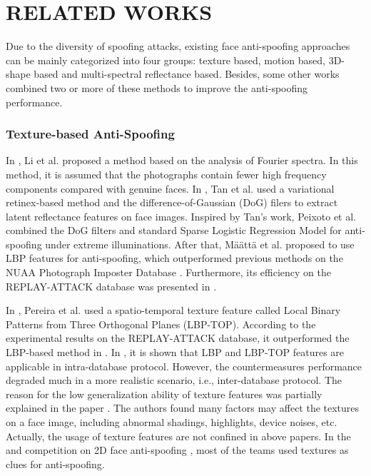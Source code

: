 \documentclass[letterpaper, 10 pt, conference]{ieeeconf}
\begin{document}
\section{RELATED WORKS}

Due to the diversity of spoofing attacks, existing face anti-spoofing approaches can be mainly categorized into four groups: texture based, motion based, 3D-shape based and multi-spectral reflectance based. Besides, some other works combined two or more of these methods to improve the anti-spoofing performance.

\subsubsection{Texture-based Anti-Spoofing}

In \cite{Face_Anti_Spoofing_JianweiLi_Fourier_2004}, Li et al. proposed a method based on the analysis of Fourier spectra. In this method, it is assumed that the photographs contain fewer high frequency components compared with genuine faces. In \cite{Face_Anti_Spoofing_XiaoyangTan_ECCV_2010}, Tan et al. used a variational retinex-based method and the difference-of-Gaussian (DoG) filers to extract latent reflectance features on face images. Inspired by Tan's work, Peixoto et al. \cite{DBLP:conf/icip/PeixotoMR11} combined the DoG filters and standard Sparse Logistic Regression Model for anti-spoofing under extreme illuminations. After that, M\"{a}\"{a}tt\"{a} et al. \cite{DBLP:conf/IJCB/Maatta} proposed to use LBP features for anti-spoofing, which outperformed previous methods on the NUAA Photograph Imposter Database \cite{DBLP:conf/eccv/TanLLJ10}. Furthermore, its efficiency on the REPLAY-ATTACK database was presented in \cite{Face_Anti_Spoofing_DataBase_Chingovska_2012}.

In \cite{de2013lbp}, Pereira et al. used a spatio-temporal texture feature called Local Binary Patterns from Three Orthogonal Planes (LBP-TOP). According to the experimental results on the REPLAY-ATTACK database, it outperformed the LBP-based method in \cite{DBLP:conf/IJCB/Maatta}. In \cite{Face_Anti_Spoofing_Pereira_2013}, it is shown that LBP and LBP-TOP features are applicable in intra-database protocol. However, the countermeasures performance degraded much in a more realistic scenario, i.e., inter-database protocol. The reason for the low generalization ability of texture features was partially explained in the paper \cite{Face_Anti_Spoofing_JianweiYang_2013}. The authors found many factors may affect the textures on a face image, including abnormal shadings, highlights, device noises, etc. Actually, the usage of texture features are not confined in above papers. In the  and  competition on 2D face anti-spoofing \cite{Face_Anti_Spoofing_Competition_2011} \cite{Face_Anti_Spoofing_Competition_2013}, most of the teams used textures as clues for anti-spoofing.
\end{document}
